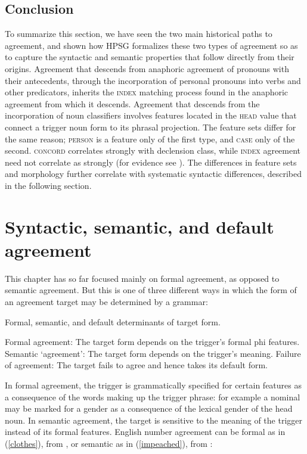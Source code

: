 \documentclass[output=paper
                ,modfonts
                ,nonflat
	        ,collection
	        ,collectionchapter
	        ,collectiontoclongg
 	        ,biblatex
                ,babelshorthands
                ,newtxmath
                ,draftmode
                ,colorlinks, citecolor=brown
]{./langsci/langscibook}
\begin{document}
{\subsection{Conclusion}
To summarize this section, we have seen the two main historical paths to agreement, and shown how HPSG formalizes these two types of agreement so as to capture the syntactic and semantic properties that follow directly from their origins.  Agreement that descends from anaphoric agreement of pronouns with their antecedents, through the incorporation of personal pronouns into verbs and other predicators, inherits the \textsc{index} matching process found in the anaphoric agreement from which it descends.  Agreement that descends from the incorporation of noun classifiers involves features located in the \textsc{head} value that connect a trigger noun form to its phrasal projection.  The feature sets differ for the same reason; \textsc{person} is a feature only of the first type, and \textsc{case} only of the second.  \textsc{concord} correlates strongly with declension class, while \textsc{index} agreement need not correlate as strongly (for evidence see \citealt[Chapter~2]{Wechsler+Zlatic:2003}).  The differences in feature sets and morphology further correlate with systematic syntactic differences, described in the following section.  


\section{Syntactic, semantic, and default agreement}
\label{pancake-sec}
 
This chapter has so far focused mainly on formal agreement, as opposed to semantic agreement.   But this is one of three different ways in which the form of an agreement target may be determined by a grammar:	

\begin{exe}
\ex   Formal, semantic, and default determinants of target form. 
\begin{xlist}
\ex	Formal agreement: The target form depends on the trigger's formal phi features.
\ex	Semantic `agreement’: The target form depends on the trigger's meaning.
\ex	Failure of agreement: The target fails to agree and hence takes its default form.
\end{xlist}
\end{exe}

\noindent
 In formal agreement, the trigger is grammatically specified for certain features as a consequence of the words making up the trigger phrase: for example a nominal may be marked for a gender as a consequence of the lexical gender of the head noun.  In semantic agreement, the target is sensitive to the meaning of the trigger instead of its formal features.  English number agreement can be formal as in (\ref{clothes}), from \citet[92]{Wechsler:2013}, or semantic as in (\ref{impeached}), from \citet[92]{Mccloskey:1991}:

}
\end{document}
